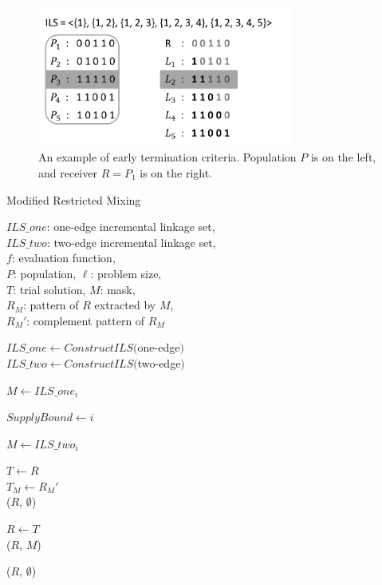 \documentclass{sig-alternate-05-2015}
\begin{document}
\begin{figure}
\centering
\includegraphics[width=3.3in]{IsinP}
\caption{An example of early termination criteria. Population $ P $ is on the left, and receiver $ R  = P_{1} $ is on the right.}
\end{figure}


\begin{algorithm}
\caption{Modified Restricted Mixing}\label{algo_disjdecomp}

$ILS\_one$: one-edge incremental linkage set,\\
$ILS\_two$: two-edge incremental linkage set,\\
$f$: evaluation function, \\
$P$: population, $\ell$: problem size, \\
$T$: trial solution, $M$: mask, \\
${R_M}$: pattern of $R$ extracted by $M$, \\
${R_M}'$: complement pattern of ${R_M}$



\BlankLine
$ILS\_one  \leftarrow ConstructILS($one-edge$)$\\
$ILS\_two  \leftarrow ConstructILS($two-edge$)$
\BlankLine
{} {
    $M \leftarrow ILS\_one_i$ \\
     {
        $ SupplyBound \leftarrow i$
       
    }
}

\BlankLine
{} {

    $M \leftarrow ILS\_two_i$ \\

     {

        $T \leftarrow R$ \\
        $T_M \leftarrow {R_M}'$ \\

         {
            \Return ($R$, $\emptyset$) 
        }

         {
            $R \leftarrow T$ \\
            \Return ($R$, $M$)
        }
    }
}
\Return ($R$, $\emptyset$) 
\end{algorithm}
\end{document}
